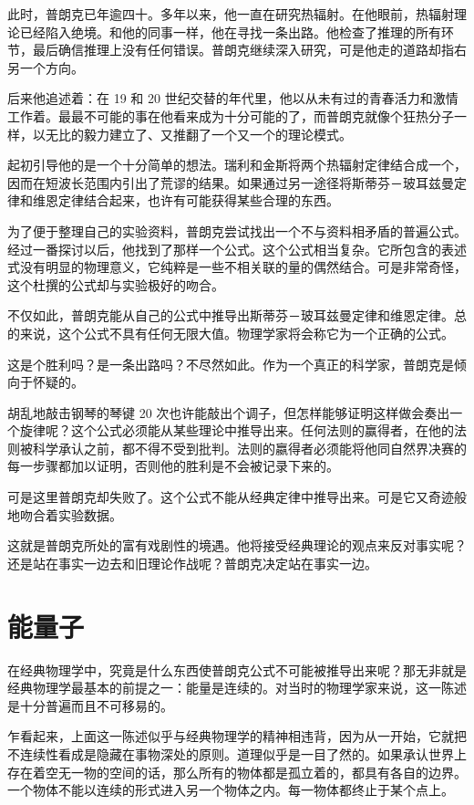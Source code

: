 此时，普朗克已年逾四十。多年以来，他一直在研究热辐射。在他眼前，热辐射理论已经陷入绝境。和他的同事一样，他在寻找一条出路。他检查了推理的所有环节，最后确信推理上没有任何错误。普朗克继续深入研究，可是他走的道路却指右另一个方向。

后来他追述着：在 19 和 20 世纪交替的年代里，他以从未有过的青春活力和激情工作着。最最不可能的事在他看来成为十分可能的了，而普朗克就像个狂热分子一样，以无比的毅力建立了、又推翻了一个又一个的理论模式。

起初引导他的是一个十分简单的想法。瑞利和金斯将两个热辐射定律结合成一个，因而在短波长范围内引出了荒谬的结果。如果通过另一途径将斯蒂芬－玻耳兹曼定律和维恩定律结合起来，也许有可能获得某些合理的东西。

为了便于整理自己的实验资料，普朗克尝试找出一个不与资料相矛盾的普遍公式。经过一番探讨以后，他找到了那样一个公式。这个公式相当复杂。它所包含的表述式没有明显的物理意义，它纯粹是一些不相关联的量的偶然结合。可是非常奇怪，这个杜撰的公式却与实验极好的吻合。

不仅如此，普朗克能从自己的公式中推导出斯蒂芬－玻耳兹曼定律和维恩定律。总的来说，这个公式不具有任何无限大值。物理学家将会称它为一个正确的公式。

这是个胜利吗？是一条出路吗？不尽然如此。作为一个真正的科学家，普朗克是倾向于怀疑的。

胡乱地敲击钢琴的琴键 20 次也许能敲出个调子，但怎样能够证明这样做会奏出一个旋律呢？这个公式必须能从某些理论中推导出来。任何法则的赢得者，在他的法则被科学承认之前，都不得不受到批判。法则的嬴得者必须能将他同自然界决赛的每一步骤都加以证明，否则他的胜利是不会被记录下来的。

可是这里普朗克却失败了。这个公式不能从经典定律中推导出来。可是它又奇迹般地吻合着实验数据。

这就是普朗克所处的富有戏剧性的境遇。他将接受经典理论的观点来反对事实呢？还是站在事实一边去和旧理论作战呢？普朗克决定站在事实一边。

\section{能量子}

在经典物理学中，究竟是什么东西使普朗克公式不可能被推导出来呢？那无非就是经典物理学最基本的前提之一：能量是连续的。对当时的物理学家来说，这一陈述是十分普遍而且不可移易的。

乍看起来，上面这一陈述似乎与经典物理学的精神相违背，因为从一开始，它就把不连续性看成是隐藏在事物深处的原则。道理似乎是一目了然的。如果承认世界上存在着空无一物的空间的话，那么所有的物体都是孤立着的，都具有各自的边界。一个物体不能以连续的形式进入另一个物体之内。每一物体都终止于某个点上。

